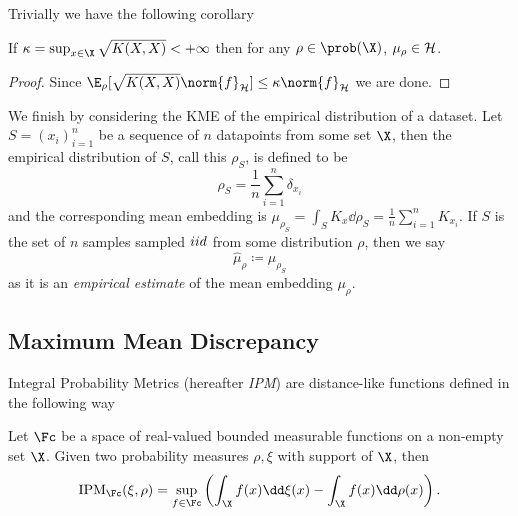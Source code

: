 Trivially we have the following corollary
\begin{corollary} If \(\kappa = \sup_{x \in \X}\sqrt{K(X, X)} < +\infty\) then
for any \(\rho \in \prob(\X)\), \(\mu_{\rho} \in \mathcal{H}\).
\end{corollary}

\begin{proof} Since \(\E_{\rho}[\sqrt{K(X, X)} \norm{f}_{\rkhs{H}}] \leq \kappa
\norm{f}_{\rkhs{H}}\) we are done.
\end{proof}

We finish by considering the KME of the empirical distribution of a dataset. Let
\(S = (x_{i})_{i=1}^{n}\) be a sequence of \(n\) datapoints from some set
\(\X\), then the empirical distribution of \(S\), call this \(\rho_{S}\), is
defined to be
\begin{equation}
\label{eq:empirical-distribution} \rho_{S} = \frac{1}{n}\sum_{i=1}^{n}
\delta_{x_{i}}
\end{equation} and the corresponding mean embedding is \(\mu_{\rho_{S}} =
\int_{S} K_{x} \dd \rho_{S} = \frac{1}{n} \sum_{i=1}^{n}K_{x_{i}}\). If \(S\) is
the set of \(n\) samples sampled \(iid\) from some distribution \(\rho\), then
we say
\begin{equation}
\label{eq:empirical-kernel-mean-embedding} \hat{\mu}_{\rho} \coloneqq
\mu_{\rho_{S}}
\end{equation} as it is an \emph{empirical estimate} of the mean embedding
\(\mu_{\rho}\).

\subsection{Maximum Mean Discrepancy} Integral Probability Metrics (hereafter
\emph{IPM}) \cite{mueller97_integ_probab_metric_their_gener_class_funct} are
distance-like functions defined in the following way
\begin{definition}
\label{def:IPM} Let \(\Fc\) be a space of real-valued bounded measurable
functions on a non-empty set \(\X\). Given two probability measures \(\rho,
\xi\) with support of \(\X\), then
  \begin{equation}
    \label{eq:IPM} \mathrm{IPM}_{\Fc}(\xi, \rho) = \sup_{f \in \Fc}\left(
\int_{\X}f(x) \dd \xi(x) - \int_{\X}f(x) \dd \rho(x) \right).
  \end{equation}
\end{definition}

